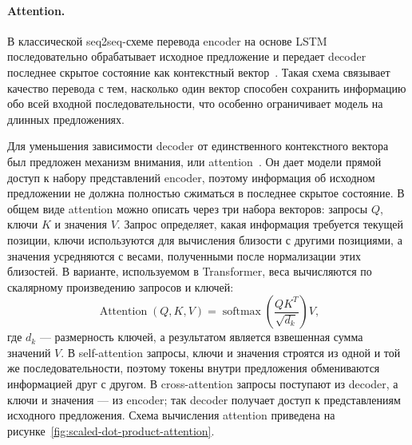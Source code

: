 \paragraph{Attention.}
В классической seq2seq-схеме перевода encoder на основе LSTM последовательно обрабатывает исходное предложение и передает decoder последнее скрытое состояние как контекстный вектор~\cite{seq2seq}. Такая схема связывает качество перевода с тем, насколько один вектор способен сохранить информацию обо всей входной последовательности, что особенно ограничивает модель на длинных предложениях.

Для уменьшения зависимости decoder от единственного контекстного вектора был предложен механизм внимания, или attention~\cite{luong,transformer}. Он дает модели прямой доступ к набору представлений encoder, поэтому информация об исходном предложении не должна полностью сжиматься в последнее скрытое состояние.
В общем виде attention можно описать через три набора векторов: запросы $Q$, ключи $K$ и значения $V$. Запрос определяет, какая информация требуется текущей позиции, ключи используются для вычисления близости с другими позициями, а значения усредняются с весами, полученными после нормализации этих близостей. В варианте, используемом в Transformer, веса вычисляются по скалярному произведению запросов и ключей:
\[
	\operatorname{Attention}(Q, K, V) =
	\operatorname{softmax}\left(\frac{QK^T}{\sqrt{d_k}}\right)V,
\]
где $d_k$ --- размерность ключей, а результатом является взвешенная сумма значений $V$.
В self-attention запросы, ключи и значения строятся из одной и той же последовательности, поэтому токены внутри предложения обмениваются информацией друг с другом.
В cross-attention запросы поступают из decoder, а ключи и значения --- из encoder; так decoder получает доступ к представлениям исходного предложения.
Схема вычисления attention приведена на рисунке~\ref{fig:scaled-dot-product-attention}.

